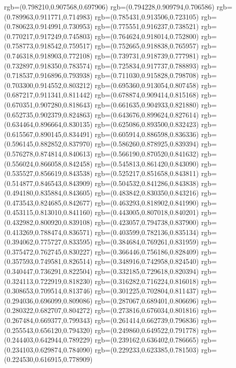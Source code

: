 {{{			rgb=(0.798210,0.907568,0.697906)
			rgb=(0.794228,0.909794,0.706586)
			rgb=(0.789963,0.911771,0.714983)
			rgb=(0.785431,0.913506,0.723105)
			rgb=(0.780623,0.914991,0.730953)
			rgb=(0.775551,0.916237,0.738521)
			rgb=(0.770217,0.917249,0.745803)
			rgb=(0.764624,0.918014,0.752800)
			rgb=(0.758773,0.918542,0.759517)
			rgb=(0.752665,0.918838,0.765957)
			rgb=(0.746318,0.918903,0.772108)
			rgb=(0.739731,0.918739,0.777981)
			rgb=(0.732897,0.918350,0.783574)
			rgb=(0.725834,0.917737,0.788893)
			rgb=(0.718537,0.916896,0.793938)
			rgb=(0.711030,0.915828,0.798708)
			rgb=(0.703300,0.914552,0.803212)
			rgb=(0.695360,0.913054,0.807458)
			rgb=(0.687217,0.911341,0.811442)
			rgb=(0.678874,0.909414,0.815168)
			rgb=(0.670351,0.907280,0.818643)
			rgb=(0.661635,0.904933,0.821880)
			rgb=(0.652735,0.902379,0.824863)
			rgb=(0.643676,0.899624,0.827614)
			rgb=(0.634464,0.896664,0.830135)
			rgb=(0.625086,0.893500,0.832423)
			rgb=(0.615567,0.890145,0.834491)
			rgb=(0.605914,0.886598,0.836336)
			rgb=(0.596145,0.882852,0.837970)
			rgb=(0.586260,0.878925,0.839394)
			rgb=(0.576278,0.874814,0.840613)
			rgb=(0.566190,0.870520,0.841632)
			rgb=(0.556024,0.866058,0.842458)
			rgb=(0.545813,0.861420,0.843090)
			rgb=(0.535527,0.856619,0.843538)
			rgb=(0.525217,0.851658,0.843811)
			rgb=(0.514877,0.846543,0.843909)
			rgb=(0.504532,0.841286,0.843838)
			rgb=(0.494180,0.835884,0.843605)
			rgb=(0.483842,0.830350,0.843216)
			rgb=(0.473543,0.824685,0.842677)
			rgb=(0.463293,0.818902,0.841990)
			rgb=(0.453115,0.813010,0.841160)
			rgb=(0.443005,0.807018,0.840201)
			rgb=(0.432982,0.800920,0.839108)
			rgb=(0.423057,0.794738,0.837900)
			rgb=(0.413269,0.788474,0.836571)
			rgb=(0.403599,0.782136,0.835134)
			rgb=(0.394062,0.775727,0.833595)
			rgb=(0.384684,0.769261,0.831959)
			rgb=(0.375472,0.762745,0.830227)
			rgb=(0.366446,0.756186,0.828409)
			rgb=(0.357593,0.749581,0.826514)
			rgb=(0.348916,0.742958,0.824540)
			rgb=(0.340447,0.736291,0.822504)
			rgb=(0.332185,0.729618,0.820394)
			rgb=(0.324113,0.722919,0.818230)
			rgb=(0.316282,0.716224,0.816018)
			rgb=(0.308653,0.709514,0.813746)
			rgb=(0.301225,0.702804,0.811437)
			rgb=(0.294036,0.696099,0.809086)
			rgb=(0.287067,0.689401,0.806696)
			rgb=(0.280322,0.682707,0.804272)
			rgb=(0.273816,0.676034,0.801816)
			rgb=(0.267484,0.669377,0.799343)
			rgb=(0.261414,0.662739,0.796836)
			rgb=(0.255543,0.656120,0.794320)
			rgb=(0.249860,0.649522,0.791778)
			rgb=(0.244403,0.642944,0.789229)
			rgb=(0.239162,0.636402,0.786665)
			rgb=(0.234103,0.629874,0.784090)
			rgb=(0.229233,0.623385,0.781503)
			rgb=(0.224530,0.616915,0.778909)
}}}
